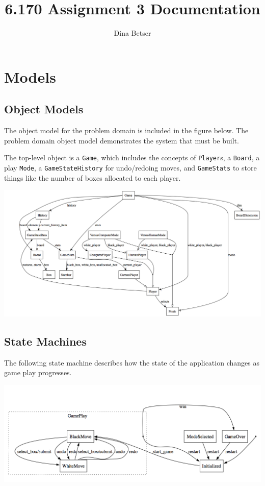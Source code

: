 \documentclass[11pt,letterpaper]{article}
\title{6.170 Assignment 3 Documentation}
\author{Dina Betser}
\begin{document}
\maketitle

\section{Models}
\subsection{Object Models}
The object model for the problem domain is included in the figure below. The problem domain object model demonstrates the system that must be built. 

The top-level object is a \texttt{Game}, which includes the concepts of \texttt{Player}s, a \texttt{Board}, a play \texttt{Mode}, a \texttt{GameStateHistory} for undo/redoing moves, and \texttt{GameStats} to store things like the number of boxes allocated to each player.
\begin{center}
\includegraphics[width=9.5in, angle=90]{dot/obmod.png}
\label{fig:ob1} 
\end{center}

\subsection{State Machines}
The following state machine describes how the state of the application changes as game play progresses.
\begin{center}
\includegraphics[width=7in]{dot/statediag.png}
\label{fig:sm1} 
\end{center}
\end{document}
